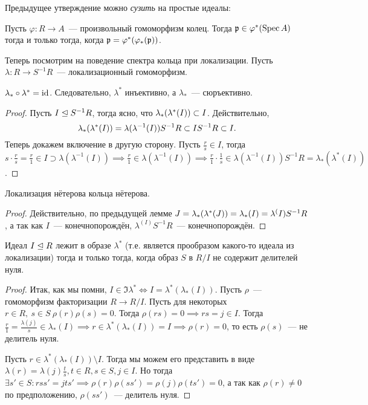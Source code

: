 	Предыдущее утверждение можно \emph{сузить} на простые идеалы:
	\begin{lemma} 
		Пусть $\varphi\colon R \to A$~--- произвольный гомоморфизм колец. Тогда $\fp \in \varphi^{*}\lr*{\Spec{A}}$ тогда и только тогда, когда $\mathfrak{p} = \varphi^{*}(\varphi_{*}(\mathfrak{p}))$.
	\end{lemma}

	Теперь посмотрим на поведение спектра кольца при локализации. Пусть $\lambda\colon R \to S^{-1}R $~--- локализационный гомоморфизм. 

	\begin{lemma} 
		$\lambda_{*} \circ \lambda^{*} = \operatorname{id}$. Следовательно, $\lambda^*$ инъективно, а $\lambda_*$~--- сюръективно. 
	\end{lemma}

	\begin{proof}
		Пусть $I \trianglelefteq  S^{-1}R$, тогда ясно, что $\lambda_{*}\lr*{\lambda^{*}\lr*{I}} \subset I$. Действительно, 
		\[
			\lambda_{*}\lr*{\lambda^{*}(I)} = \lambda(\lambda^{-1}(I))S^{-1}R \subset I S^{-1}R  \subset I.
		\]
		Теперь докажем включение в другую сторону. Пусть $\frac{r}{s} \in I$, тогда $s \cdot \frac{r}{s}  = \frac{r}{1} \in I \supset \lambda(\lambda^{-1}(I)) \implies \frac{r}{1} \in \lambda(\lambda^{-1}(I)) \implies \frac{r}{1} \cdot \frac{1}{s} \in \lambda(\lambda^{-1}(I))S^{-1}R = \lambda_{*}(\lambda^{*}(I))$.
	\end{proof}

	\begin{corollary}
		Локализация нётерова кольца нётерова.
	\end{corollary}

	\begin{proof}
		Действительно, по предыдущей лемме $J = \lambda_{*}\lr*{\lambda^{*}(J)} = \lambda_{*}(I) = \lambda^(I)S^{-1}R$, а так как $I$~--- конечнопорождён, $\lambda^(I)S^{-1}R$~--- конечнопорождён. 
	\end{proof}

	\begin{lemma} 
		Идеал $I \trianglelefteq R$ лежит в образе $\lambda^*$ (т.е. является прообразом какого-то идеала из локализации) тогда и только тогда, когда образ $S$ в $R/I$ не содержит делителей нуля. 
	\end{lemma}

	\begin{proof}
		Итак, как мы помни, $I \in \Im{\lambda^*} \Leftrightarrow I = \lambda^*(\lambda_*(I))$. Пусть $\rho$~--- гомоморфизм факторизации $R \to R/I$. Пусть для некоторых $r \in R, \ s \in S \ \rho(r)\rho(s) = 0$. Тогда $\rho(rs) = 0 \implies rs = j \in I$. Тогда $\frac{r}{1} = \frac{\lambda(j)}{s} \in \lambda_*(I) \implies r \in \lambda^*(\lambda_*(I)) = I \implies \rho(r) = 0$, то есть $\rho(s)$~--- не делитель нуля. 

		Пусть $r \in \lambda^*(\lambda_*(I)) \setminus I$. Тогда мы можем его представить в виде $\lambda(r) = \lambda(j) \frac{t}{s}, t \in R, s \in S, j \in I$. Но тогда $\exists s' \in S\colon r s s' = j t s' \implies \rho(r)\rho(s s') = \rho(j) \rho(t s') = 0$, а так как $\rho(r) \neq 0$ по предположению, $\rho(s s')$~--- делитель нуля. 
	\end{proof}

